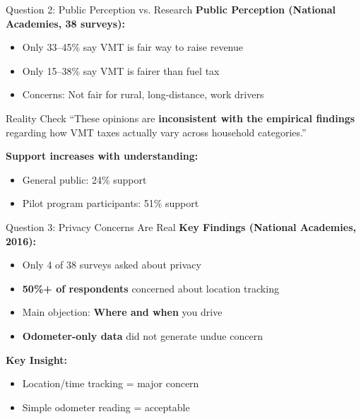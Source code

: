 \documentclass[aspectratio=169]{beamer}
\begin{document}
\begin{frame}{Question 2: Public Perception vs. Research}
\textbf{Public Perception (National Academies, 38 surveys):}
\begin{itemize}
\item Only 33--45\% say VMT is fair way to raise revenue
\item Only 15--38\% say VMT is fairer than fuel tax
\item Concerns: Not fair for rural, long-distance, work drivers
\end{itemize}

\vspace{0.5cm}
\begin{alertblock}{Reality Check}
``These opinions are \textbf{inconsistent with the empirical findings} regarding how VMT taxes actually vary across household categories.''
\end{alertblock}

\vspace{0.3cm}
\textbf{Support increases with understanding:}
\begin{itemize}
\item General public: 24\% support
\item Pilot program participants: 51\% support
\end{itemize}
\end{frame}


\begin{frame}{Question 3: Privacy Concerns Are Real}
\textbf{Key Findings (National Academies, 2016):}
\begin{itemize}
\item Only 4 of 38 surveys asked about privacy
\item \textbf{50\%+ of respondents} concerned about location tracking
\item Main objection: \textbf{Where and when} you drive
\item \textbf{Odometer-only data} did not generate undue concern
\end{itemize}

\vspace{0.5cm}
\textbf{Key Insight:}
\begin{itemize}
\item Location/time tracking = major concern
\item Simple odometer reading = acceptable
\end{itemize}
\end{frame}
\end{document}
